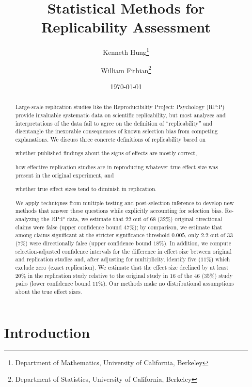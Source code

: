\documentclass[11pt]{article}
\theoremstyle{definition}
\theoremstyle{custom}
\begin{document}
\title{Statistical Methods for Replicability Assessment}
\date{\today}
\author{
  Kenneth Hung\thanks{Department of Mathematics, University of California, Berkeley} \and
  William Fithian\thanks{Department of Statistics, University of California, Berkeley}
}
\maketitle

\begin{abstract}
  Large-scale replication studies like the Reproducibility Project: Psychology (RP:P) provide invaluable systematic data on scientific replicability, but most analyses and interpretations of the data fail to agree on the definition of ``replicability'' and disentangle the inexorable consequences of known selection bias from competing explanations. We discuss three concrete definitions of replicability based on
  \begin{inlinelist}
    \item whether published findings about the signs of effects are mostly correct,
    \item how effective replication studies are in reproducing whatever true effect size was present in the original experiment, and
    \item whether true effect sizes tend to diminish in replication.
  \end{inlinelist}
  We apply techniques from multiple testing and post-selection inference to develop new methods that answer these questions while explicitly accounting for selection bias. Re-analyzing the RP:P data, we estimate that $22$ out of $68$ ($32\%$) original directional claims were false (upper confidence bound $47\%$); by comparison, we estimate that among claims significant at the stricter significance threshold $0.005$, only $2.2$ out of $33$ ($7\%$) were directionally false (upper confidence bound $18\%$). In addition, we compute selection-adjusted confidence intervals for the difference in effect size between original and replication studies and, after adjusting for multiplicity, identify five ($11\%$) which exclude zero (exact replication). We estimate that the effect size declined by at least $20\%$ in the replication study relative to the original study in $16$ of the $46$ ($35\%$) study pairs (lower confidence bound $11\%$). Our methods make no distributional assumptions about the true effect sizes.
\end{abstract}

\section{Introduction}
\label{sec:intro}
\end{document}
